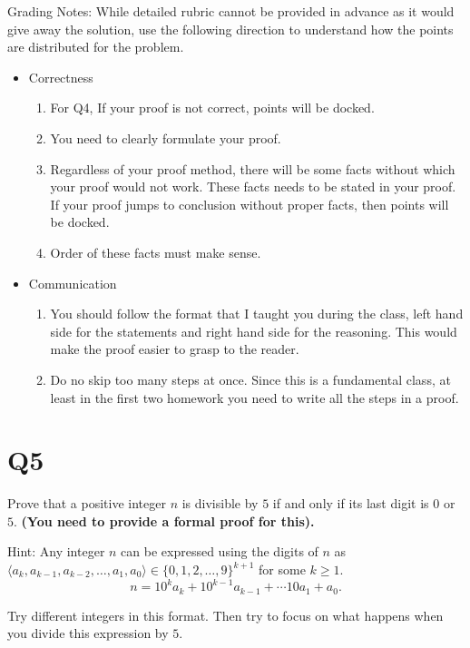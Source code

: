 \documentclass[12pt]{exam}
\begin{document}
Grading Notes:
While detailed rubric cannot be provided in advance as it would give away the solution, use the following direction to understand how the points are distributed for the problem.
\begin{itemize}
    \item Correctness
    \begin{enumerate}
        \item For Q4, If your proof is not correct, points will be docked. 
        \item You need to clearly formulate your proof.
        \item Regardless of your proof method, there will be some facts without which your proof would not work. These facts needs to be stated in your proof. If your proof jumps to conclusion without proper facts, then points will be docked.
        \item Order of these facts must make sense. 
    \end{enumerate}
        
    \item Communication 
        \begin{enumerate}
            \item You should follow the format that I taught you during the class, left hand side for the statements and right hand side for the reasoning. This would make the proof easier to grasp to the reader.
            \item Do no skip too many steps at once. Since this is a fundamental class, at least in the first two homework you need to write all the steps in a proof. 
        \end{enumerate}
         
\end{itemize}

\section{Q5} 
Prove that a positive integer $n$ is divisible by $5$ if and only if its last digit is $0$ or $5$. \textbf{(You need to provide a formal proof for this).}


Hint: Any integer $n$ can be expressed using the digits of $n$ as $\langle a_k, a_{k-1}, a_{k-2}, \ldots , a_1, a_0 \rangle \in \{0,1,2,\dots, 9\}^{k+1}$ for some $k \geq 1$.
\[ n = 10^ka_k + 10^{k-1}a_{k-1} + \cdots 10a_1 + a_0.\]

Try different integers in this format. Then try to focus on what happens when you divide this expression by $5$. 
\end{document}
